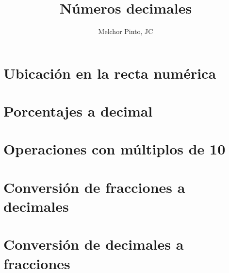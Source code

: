 \documentclass{guia}
\title{Números decimales}
\author{Melchor Pinto, JC}
\begin{document}
%
\begin{questions}
\section{Ubicación en la recta numérica}
\questionboxed{}
\section{Porcentajes a decimal}
\questionboxed{}
\section{Operaciones con múltiplos de 10}
\questionboxed{}
\section{Conversión de fracciones a decimales}
\questionboxed{}
\section{Conversión de decimales a fracciones}
\questionboxed{}


\end{questions}
\end{document}

